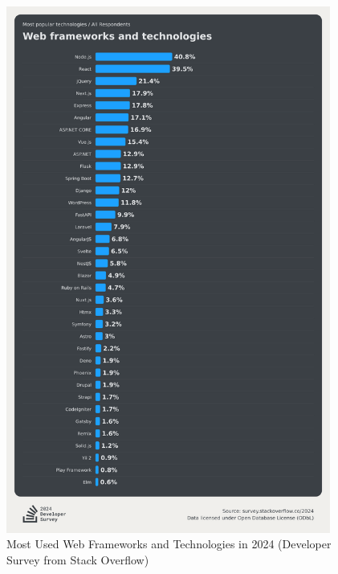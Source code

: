 \begin{figure}[htbp]
  \centering
  \includegraphics[width=0.95\textwidth]{gfx/figures/FrameworkSurvey2024.png}
  \caption{Most Used Web Frameworks and Technologies in 2024 (Developer Survey from Stack Overflow) \cite{frontend:popularity}}
  \label{fig:methodology:popularFE}
\end{figure}
\clearpage

